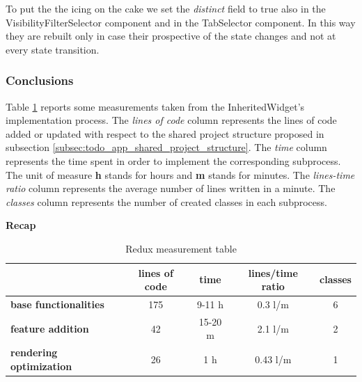 To put the  the icing on the cake we set the \textit{distinct} field to true also in the VisibilityFilterSelector component and in the TabSelector component. In this way they are rebuilt only in case their prospective of the state changes and not at every state transition.

\subsubsection{Conclusions} 
\label{subpar:render_optimizations_redux}
Table \ref{table:recap_redux} reports some measurements taken from the InheritedWidget's implementation process. The \textit{lines of code} column represents the lines of code added or updated with respect to the shared project structure proposed in subsection \ref{subsec:todo_app_shared_project_structure}. The \textit{time }column represents the time spent in order to implement the corresponding subprocess. The unit of measure \textbf{h} stands for hours and \textbf{m} stands for minutes. The \textit{lines-time ratio} column represents the average number of lines written in a minute. The \textit{classes} column represents the number of created classes in each subprocess.
\begin{table}[H]
    \caption*{\textbf{Recap}}
    \centering 
    
    \begin{tabular}{| l | c | c | c | c |}
    \hline
    \rowcolor{bluepoli!40} %
    \hline
     & \textbf{lines of code} & \textbf{time} & \textbf{lines/time ratio} & \textbf{classes} \T\B \\
    \hline
    \textbf{base functionalities} & 175 & 9-11 h & 0.3 l/m & 6 \T\B \\ 
    \textbf{feature addition} & 42 & 15-20 m & 2.1 l/m & 2 \T\B\\ 
    \textbf{rendering optimization} & 26 & 1 h & 0.43 l/m & 1
    \T\B\\
    \hline
    \end{tabular}
    \\[10pt]
    \caption{Redux measurement table}
    \label{table:recap_redux}
\end{table}

